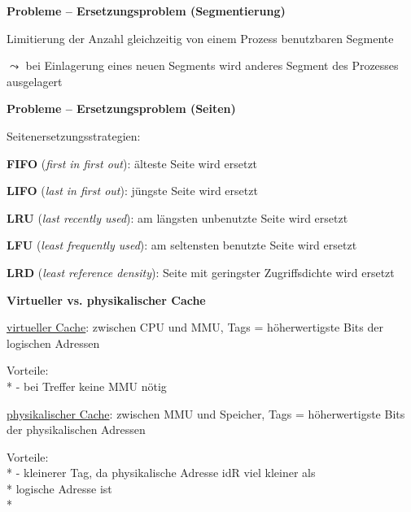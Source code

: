 \textbf{Probleme -- Ersetzungsproblem (Segmentierung)}
\begin{items}
  \item Limitierung der Anzahl gleichzeitig von einem Prozess benutzbaren Segmente
  \item \( \leadsto \) bei Einlagerung eines neuen Segments wird anderes Segment des Prozesses ausgelagert
\end{items}

\textbf{Probleme -- Ersetzungsproblem (Seiten)}
\begin{items}
  \item Seitenersetzungsstrategien:
  \begin{enumeration}
    \item \textbf{FIFO} (\emph{first in first out}): älteste Seite wird ersetzt
    \item \textbf{LIFO} (\emph{last in first out}): jüngste Seite wird ersetzt
    \item \textbf{LRU} (\emph{last recently used}): am längsten unbenutzte Seite wird ersetzt
    \item \textbf{LFU} (\emph{least frequently used}): am seltensten benutzte Seite wird ersetzt
    \item \textbf{LRD} (\emph{least reference density}): Seite mit geringster Zugriffsdichte wird ersetzt
  \end{enumeration}
\end{items}

\textbf{Virtueller vs. physikalischer Cache}
\begin{items}
  \item \underline{virtueller Cache}: zwischen CPU und MMU, Tags = höherwertigste Bits der logischen Adressen
  \item Vorteile: \\*
    - bei Treffer keine MMU nötig
  \item \underline{physikalischer Cache}: zwischen MMU und Speicher, Tags = höherwertigste Bits der physikalischen Adressen
  \item Vorteile: \\*
    - kleinerer Tag, da physikalische Adresse idR viel kleiner als \\* \phantom{-} logische Adresse ist \\*
\end{items}

\newpage

